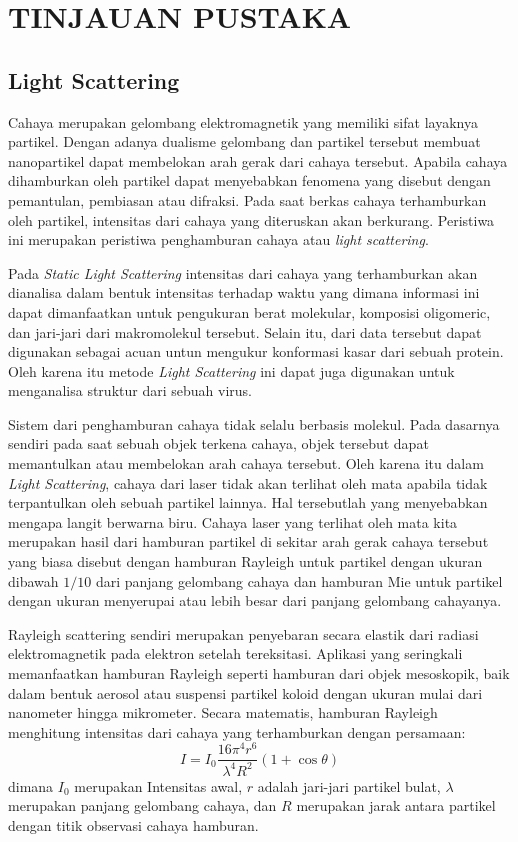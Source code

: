 \chapter{TINJAUAN PUSTAKA}

\section{Light Scattering}
Cahaya merupakan gelombang elektromagnetik yang memiliki sifat layaknya partikel. Dengan adanya
dualisme gelombang dan partikel tersebut membuat nanopartikel dapat membelokan arah gerak dari
cahaya tersebut. Apabila cahaya dihamburkan oleh partikel dapat menyebabkan fenomena yang disebut
dengan pemantulan, pembiasan atau difraksi. Pada saat berkas cahaya terhamburkan oleh partikel,
intensitas dari cahaya yang diteruskan akan berkurang. Peristiwa ini merupakan peristiwa penghamburan
cahaya atau \textit{light scattering}\cite{Black1996}.

Pada \textit{Static Light Scattering} intensitas dari cahaya yang terhamburkan  akan dianalisa dalam
bentuk intensitas terhadap waktu yang dimana informasi ini dapat dimanfaatkan untuk pengukuran berat
molekular, komposisi oligomeric, dan jari-jari dari makromolekul tersebut. Selain itu, dari data
tersebut dapat digunakan sebagai acuan untun mengukur konformasi kasar dari sebuah protein. Oleh
karena itu metode \textit{Light Scattering} ini dapat juga digunakan untuk menganalisa struktur dari
sebuah virus\cite{Stetefeld2016}.

Sistem dari penghamburan cahaya tidak selalu berbasis molekul. Pada dasarnya sendiri pada saat
sebuah objek terkena cahaya, objek tersebut dapat memantulkan atau membelokan arah cahaya tersebut.
Oleh karena itu dalam \textit{Light Scattering}, cahaya dari laser tidak akan terlihat oleh mata
apabila tidak terpantulkan oleh sebuah partikel lainnya. Hal tersebutlah yang menyebabkan mengapa
langit berwarna biru. Cahaya laser yang terlihat oleh mata kita merupakan hasil dari hamburan
partikel di sekitar arah gerak cahaya tersebut yang biasa disebut dengan hamburan
Rayleigh untuk partikel dengan ukuran dibawah ${1/10}$ dari panjang gelombang cahaya
dan hamburan Mie untuk partikel dengan ukuran menyerupai atau lebih besar dari
panjang gelombang cahayanya\cite{Zidan2022,Chew2019}.

Rayleigh scattering sendiri merupakan penyebaran secara elastik dari radiasi elektromagnetik
pada elektron setelah tereksitasi. Aplikasi yang seringkali memanfaatkan hamburan
Rayleigh seperti hamburan dari objek mesoskopik, baik dalam bentuk aerosol atau
suspensi partikel koloid dengan ukuran mulai dari nanometer hingga mikrometer\cite{Piazza2005}.
Secara matematis, hamburan Rayleigh menghitung intensitas dari cahaya yang terhamburkan
dengan persamaan:
\begin{equation}
    I = I_0 \frac{16 {\pi}^4 r^6}{\lambda^4 R^2} \left(1 + \cos \theta \right)
    \label{eq:rayleigh}
\end{equation}
\noindent
dimana ${I_0}$ merupakan Intensitas awal, ${r}$ adalah jari-jari partikel bulat, ${\lambda}$
merupakan panjang gelombang cahaya, dan ${R}$ merupakan jarak antara partikel dengan
titik observasi cahaya hamburan\cite{Thomas1991}.


